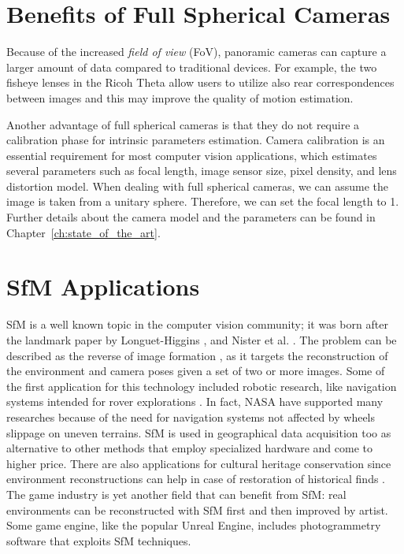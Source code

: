 \section{Benefits of Full Spherical Cameras}
Because of the increased \textit{field of view} (FoV), panoramic cameras can capture a larger amount of data compared to traditional devices. For example, the two fisheye lenses in the Ricoh Theta allow users to utilize also rear correspondences between images and this may improve the quality of motion estimation.

Another advantage of full spherical cameras is that they do not require a calibration phase for intrinsic parameters estimation. Camera calibration is an essential requirement for most computer vision applications, which estimates several parameters such as focal length, image 
sensor size, pixel density, and lens distortion model. When dealing with full spherical cameras, we can assume the image is taken from a unitary sphere. Therefore, we can set the focal length to 1. Further details about the camera model and the parameters can be found in Chapter~\ref{ch:state_of_the_art}.

\section{SfM Applications}
SfM is a well known topic in the computer vision community; it was born after 
the landmark paper by Longuet-Higgins \cite{longuet1981computer}, and
Nister et al. \cite{moravec1980obstacle}.
The problem can be described as the reverse of image formation
\cite{Wei2013}, as it targets the reconstruction of the environment 
and camera poses given a set of two or more images.
Some of the first application for this technology included robotic research, 
like navigation systems intended for rover explorations 
\cite{moravec1980obstacle,durrant1996localization}. In fact, NASA have supported
many researches because of the need for navigation systems not affected by wheels
slippage on uneven terrains.
SfM is used in geographical data acquisition too
\cite{fonstad2013topographic,westoby2012structure,james2012straightforward}
as alternative to other methods that employ specialized hardware and 
come to higher price.
There are also applications for cultural heritage conservation since 
environment reconstructions can help in case of restoration of historical finds
\cite{kraus2007photogrammetry}.
The game industry is yet another field that can benefit from 
SfM: real environments can be reconstructed with SfM first and then 
improved by artist. Some game engine, like the popular Unreal Engine\registered,
includes photogrammetry software that exploits SfM techniques. 
